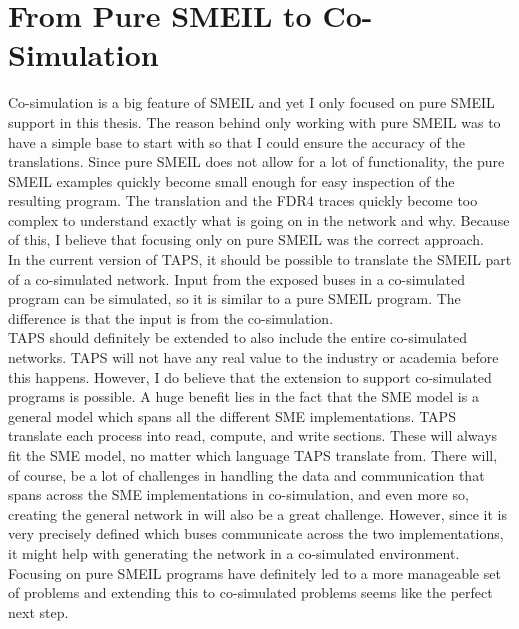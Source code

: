 \section{From Pure SMEIL to Co-Simulation}
Co-simulation is a big feature of SMEIL and yet I only focused on pure SMEIL support in this thesis. The reason behind only working with pure SMEIL was to have a simple base to start with so that I could ensure the accuracy of the translations. Since pure SMEIL does not allow for a lot of functionality, the pure SMEIL examples quickly become small enough for easy inspection of the resulting \cspm{} program.
The translation and the FDR4 traces quickly become too complex to understand exactly what is going on in the network and why. Because of this, I believe that focusing only on pure SMEIL was the correct approach.\\

In the current version of TAPS, it should be possible to translate the SMEIL part of a co-simulated network. Input from the exposed buses in a co-simulated program can be simulated, so it is similar to a pure SMEIL program. The difference is that the input is from the co-simulation.\\

TAPS should definitely be extended to also include the entire co-simulated networks. TAPS will not have any real value to the industry or academia before this happens. However, I do believe that the extension to support co-simulated programs is possible. A huge benefit lies in the fact that the SME model is a general model which spans all the different SME implementations. TAPS translate each process into read, compute, and write sections. These will always fit the SME model, no matter which language TAPS translate from.
There will, of course, be a lot of challenges in handling the data and communication that spans across the SME implementations in co-simulation, and even more so, creating the general network in \cspm{} will also be a great challenge. However, since it is very precisely defined which buses communicate across the two implementations, it might help with generating the \cspm{} network in a co-simulated environment.\\

Focusing on pure SMEIL programs have definitely led to a more manageable set of problems and extending this to co-simulated problems seems like the perfect next step.


